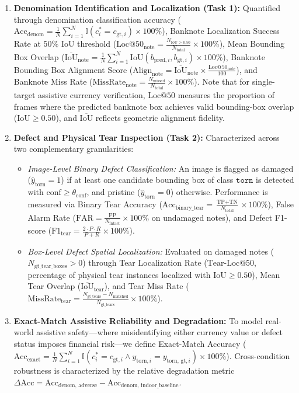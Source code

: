 \documentclass[final,5p,times,twocolumn,authoryear]{elsarticle}
\begin{document}
\begin{enumerate}[label=(\roman*)]
    \item \textbf{Denomination Identification and Localization (Task 1):} Quantified through denomination classification accuracy ($\text{Acc}_{\text{denom}} = \frac{1}{N} \sum_{i=1}^N \mathbb{I}(c^*_i = c_{\text{gt}, i}) \times 100\%$), Banknote Localization Success Rate at $50\%$ IoU threshold ($\text{Loc@50}_{\text{note}} = \frac{N_{\text{IoU} \ge 0.50}}{N_{\text{total}}} \times 100\%$), Mean Bounding Box Overlap ($\overline{\text{IoU}}_{\text{note}} = \frac{1}{N} \sum_{i=1}^N \text{IoU}(b_{\text{pred}, i}, b_{\text{gt}, i}) \times 100\%$), Banknote Bounding Box Alignment Score ($\text{Align}_{\text{note}} = \overline{\text{IoU}}_{\text{note}} \times \frac{\text{Loc@50}_{\text{note}}}{100}$), and Banknote Miss Rate ($\text{MissRate}_{\text{note}} = \frac{N_{\text{missed}}}{N_{\text{total}}} \times 100\%$). Note that for single-target assistive currency verification, $\text{Loc@50}$ measures the proportion of frames where the predicted banknote box achieves valid bounding-box overlap ($\text{IoU} \ge 0.50$), and $\overline{\text{IoU}}$ reflects geometric alignment fidelity.
    \item \textbf{Defect and Physical Tear Inspection (Task 2):} Characterized across two complementary granularities:
    \begin{itemize}
        \item \textit{Image-Level Binary Defect Classification:} An image is flagged as damaged ($\hat{y}_{\text{torn}} = 1$) if at least one candidate bounding box of class $\texttt{torn}$ is detected with $\text{conf} \ge \theta_{\text{conf}}$, and pristine ($\hat{y}_{\text{torn}} = 0$) otherwise. Performance is measured via Binary Tear Accuracy ($\text{Acc}_{\text{binary\_tear}} = \frac{\text{TP} + \text{TN}}{N_{\text{total}}} \times 100\%$), False Alarm Rate ($\text{FAR} = \frac{\text{FP}}{N_{\text{intact}}} \times 100\%$ on undamaged notes), and Defect F1-score ($\text{F1}_{\text{tear}} = \frac{2 \cdot P \cdot R}{P + R} \times 100\%$).
        \item \textit{Box-Level Defect Spatial Localization:} Evaluated on damaged notes ($N_{\text{gt\_tear\_boxes}} > 0$) through Tear Localization Rate ($\text{Tear-Loc@50}$, percentage of physical tear instances localized with $\text{IoU} \ge 0.50$), Mean Tear Overlap ($\overline{\text{IoU}}_{\text{tear}}$), and Tear Miss Rate ($\text{MissRate}_{\text{tear}} = \frac{N_{\text{gt\_tears}} - N_{\text{matched}}}{N_{\text{gt\_tears}}} \times 100\%$).
    \end{itemize}
    \item \textbf{Exact-Match Assistive Reliability and Degradation:} To model real-world assistive safety---where misidentifying either currency value or defect status imposes financial risk---we define Exact-Match Accuracy ($\text{Acc}_{\text{exact}} = \frac{1}{N} \sum_{i=1}^N \mathbb{I}(c^*_i = c_{\text{gt}, i} \land \hat{y}_{\text{torn}, i} = y_{\text{torn, gt}, i}) \times 100\%$). Cross-condition robustness is characterized by the relative degradation metric $\Delta\text{Acc} = \text{Acc}_{\text{denom, adverse}} - \text{Acc}_{\text{denom, indoor\_baseline}}$.
\end{enumerate}
\end{document}
